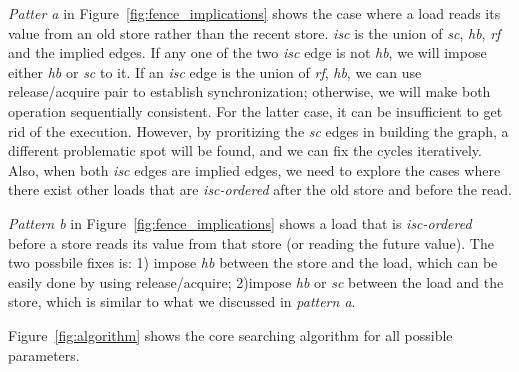  \textit{Patter a} in
Figure~\ref{fig:fence_implications} shows the case where a load reads
its value from an old store rather than the recent store. \textit{isc} is
the union of \textit{sc}, \textit{hb}, \textit{rf} and the implied edges. If any one of
the two \textit{isc} edge is not \textit{hb}, we will impose either \textit{hb} or
\textit{sc} to it. If an \textit{isc} edge is the union of \textit{rf},
\textit{hb}, we can use release/acquire pair to establish synchronization;
otherwise, we will make both operation sequentially consistent. For the latter
case, it can be insufficient to get rid of the execution. However, by
proritizing the \textit{sc} edges in building the graph, a different problematic
spot will be found, and we can fix the cycles iteratively. Also, when both
\textit{isc} edges are implied edges, we need to explore the cases where there
exist other loads that are \textit{isc-ordered} after the old store and before
the read.


 \textit{Pattern b} in
Figure~\ref{fig:fence_implications} shows a load that is \textit{isc-ordered}
before a store reads its value from that store (or reading the future value).
The two possbile fixes is: 1) impose \textit{hb} between the store and the load,
which can be easily done by using release/acquire; 2)impose \textit{hb} or
\textit{sc} between the load and the store, which is similar to what we
discussed in \textit{pattern a}.

Figure~\ref{fig:algorithm} shows the core searching algorithm for all possible
parameters.

